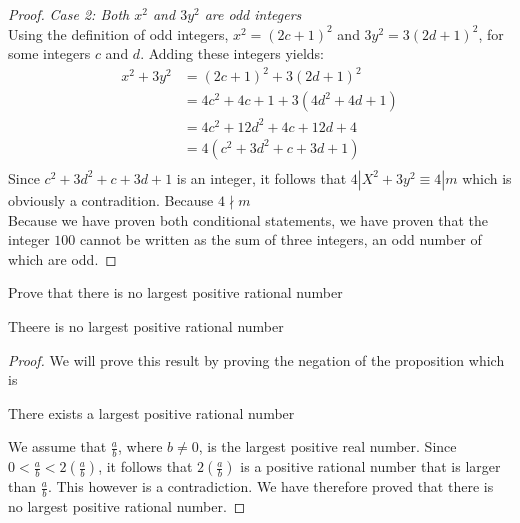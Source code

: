 \begin{example}
\begin{proof}
    \textit{Case 2: Both $x^2$ and $3y^2$ are odd integers} \\
        Using the definition of odd integers, $x^2 = (2c + 1)^2$ and $3y^2 = 3(2d + 1)^2$, for some integers $c$ and $d$. Adding these integers yields: 
            \begin{align*}
                 x^2 + 3y^2 & = (2c + 1)^2 + 3(2d + 1)^2 \\
                    & = 4c^2 + 4c + 1 + 3(4d^2 + 4d + 1) \\
                    & = 4c^2 + 12d^2 + 4c + 12d + 4  \\
                    & = 4(c^2 + 3d^2 + c + 3d + 1)  \\
            \end{align*}
        Since $c^2 + 3d^2 + c + 3d + 1$ is an integer,  it follows that $4 | X^2 + 3y^2 \equiv 4 | m$ which is obviously a contradition. Because $4 \nmid m$ \\
        
    Because we have proven both conditional statements, we have proven that the integer $100$ cannot be written as the sum of three integers, an odd number of which are odd. 
\end{proof}
\end{example}


\newpage
\begin{example}
Prove that there is no largest positive rational number
\begin{tcolorbox}
    \begin{theorem}
        Theere is no largest positive rational number
    \end{theorem} 
\end{tcolorbox}


\begin{proof}

We will prove this result by proving the negation of the proposition which is
	\begin{center}
		There exists a largest positive rational number
	\end{center}

We assume that $\frac{a}{b}$, where $b \neq 0$, is the largest positive real number. Since $0 < \frac{a}{b} < 2(\frac{a}{b})$, it follows that $2(\frac{a}{b})$ is a positive rational number that is larger than $\frac{a}{b}$. This however is a contradiction. We have therefore proved that there is no largest positive rational number.
\end{proof}
\end{example}

